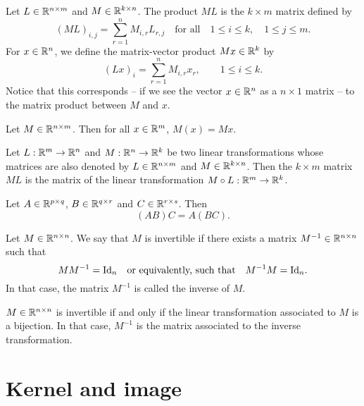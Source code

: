 \documentclass[11pt,nocut]{article}
\begin{document}
\begin{definition}
	Let $L \in \mathbb{R}^{n \times m}$ and $M \in \mathbb{R}^{k \times n}$. The product $M L$ is the $k \times m$ matrix defined by
	$$
	(ML)_{i,j} = \sum_{r=1}^n M_{i,r} L_{r,j} \quad \text{for all} \quad 1 \leq i \leq k, \quad 1 \leq j \leq m.
	$$
	For $x \in \mathbb{R}^n$, we define the matrix-vector product $M x \in \mathbb{R}^k$ by
	$$
	(Lx)_i = \sum_{r=1}^n M_{i,r} x_r, \qquad 1 \leq i \leq k.
	$$
	Notice that this corresponds -- if we see the vector $x \in \mathbb{R}^n$ as a $n \times 1$ matrix -- to the matrix product between $M$ and $x$.
\end{definition}

\begin{proposition}
	Let $M \in \mathbb{R}^{n \times m}$. Then for all $x \in \mathbb{R}^m$,
	$M(x) = Mx$.
\end{proposition}

\begin{proposition}
	Let $L: \mathbb{R}^m \to \mathbb{R}^n$ and $M: \mathbb{R}^n \to \mathbb{R}^k$ be two linear transformations whose matrices are also denoted by $L \in \mathbb{R}^{n \times m}$ and $M \in \mathbb{R}^{k \times n}$.
	Then the $k \times m$ matrix $ML$ is the matrix of the linear transformation $M \circ L: \mathbb{R}^m \to \mathbb{R}^k$.
\end{proposition}

\begin{proposition}
	Let $A \in \mathbb{R}^{p \times q}$, $B \in \mathbb{R}^{q \times r}$ and $C \in \mathbb{R}^{r \times s}$. Then
	$$
	(AB) C = A (BC).
	$$
\end{proposition}

\begin{definition}
	Let $M \in \mathbb{R}^{n \times n}$. We say that $M$ is invertible if there exists a matrix $M^{-1} \in \mathbb{R}^{n \times n}$ such that 
	$$
	M M^{-1} = {{\rm Id}}_n \quad \text{or equivalently, such that} \quad M^{-1} M = {{\rm Id}}_n.
	$$
	In that case, the matrix $M^{-1}$ is called the inverse of $M$.
\end{definition}

\begin{remark}
	$M \in \mathbb{R}^{n \times n}$ is invertible if and only if the linear transformation associated to $M$ is a bijection. In that case, $M^{-1}$ is the matrix associated to the inverse transformation.
\end{remark}

\section{Kernel and image}
\end{document}
